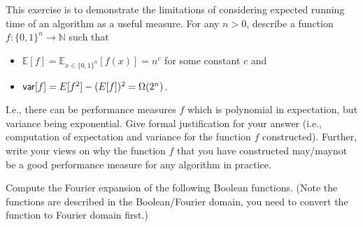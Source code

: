 \documentclass[12pt, a4paper, onecolumn]{exam}
\begin{document}
\begin{questions}

	\question[10]  This exercise is to demonstrate the limitations of considering expected running time of an algorithm as a useful measure. For any $n>0$, describe  a function $f:\{0,1\}^n \to \mathbb{N}$ such that
	\begin{itemize}
		\item $\mathbb{E}[f] = \mathbb{E}_{x\in \{0,1\}^n}[f(x)] = n^c$ for some constant $c$ and
		\item ${\sf var}[f] = E[f^2] - (E[f])^2 = \Omega(2^n)$.
	\end{itemize}
	I.e., there can be performance measures $f$ which is polynomial in expectation, but variance being exponential. Give formal justification for your answer (i.e., computation of expectation and variance for the function $f$ constructed).  Further, write your views on why the function $f$ that you have constructed may/maynot be a good performance measure for any algorithm in practice.

	\question[10]  Compute the Fourier expansion of the following Boolean functions. (Note the functions are described in the Boolean/Fourier domain, you need to convert the function to Fourier domain first.)
\end{questions}
\end{document}
